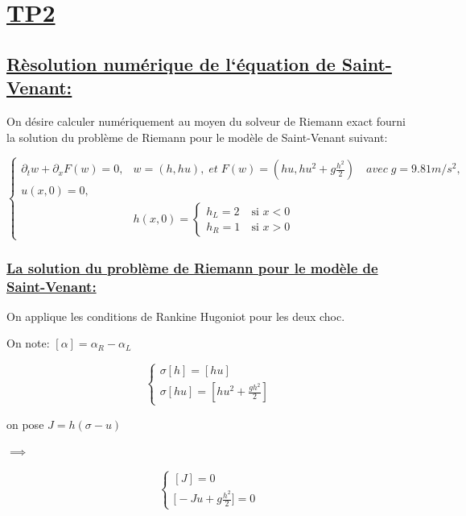 \chapter[TP2]{\uline{TP2}}
\section[R\`esolution num\'erique de l`\'equation de Saint-Venant]{\uline{R\`esolution num\'erique de l`\'equation de Saint-Venant:}}

On d\'esire calculer num\'eriquement au moyen du solveur de Riemann exact fourni la solution du problème de Riemann pour le
modèle de Saint-Venant suivant:

\begin{equation}
\label{systeme}
\left \lbrace \begin{array}{rl}
\partial_t w +  \partial_x F(w)= 0, & w = (h, hu), \; et \; F(w) = (h u,h u^2 + g \frac{h^2}{2}) \quad avec \; g = 9.81 m/s^2,  \\
u(x,0) = 0,  \\
& h(x,0) =
\left \lbrace \begin{array}{rl}
h_L = 2 & ~\text{si }  x < 0\\
h_R = 1 & ~\text{si }  x > 0
\end{array}\right.
\end{array}\right.
\end{equation}


\subsection[La solution du probl\`eme de Riemann pour le mod\`ele de Saint-Venant]{\uline{La solution du probl\`eme de Riemann pour le mod\`ele de Saint-Venant:}}
On applique les conditions de Rankine Hugoniot pour les deux choc.

On note: $[\alpha] = \alpha_R - \alpha_L$

\begin{equation}
\label{systeme}
\left \lbrace \begin{array}{rl}
\sigma [h] = [hu]\\
\sigma [hu] = [h u^2 +  \frac{g h^2}{2}]
\end{array}\right.
\end{equation}

on pose $J = h(\sigma - u)$

$\implies$

$$
\left \lbrace \begin{array}{rl}
[J] = 0\\
\big [-J u + g \frac{h^2}{2} \big]= 0
\end{array}\right.
$$

